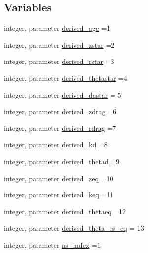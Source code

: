 \subsection*{Variables}
\begin{DoxyCompactItemize}
\item 
integer, parameter \mbox{\hyperlink{namespacecosmologytypes_ac41d8787a0c66b372de6431ec8d5d90e}{derived\+\_\+age}} =1
\item 
integer, parameter \mbox{\hyperlink{namespacecosmologytypes_ae9b4848c3438334ab15af3a9c5e38947}{derived\+\_\+zstar}} =2
\item 
integer, parameter \mbox{\hyperlink{namespacecosmologytypes_a273d7a236ebfc592e91d30f5f1d65691}{derived\+\_\+rstar}} =3
\item 
integer, parameter \mbox{\hyperlink{namespacecosmologytypes_a3828603ab7ab791295ab034337359f18}{derived\+\_\+thetastar}} =4
\item 
integer, parameter \mbox{\hyperlink{namespacecosmologytypes_ad7c434d95788f75aebc8ad1a2344ae22}{derived\+\_\+dastar}} = 5
\item 
integer, parameter \mbox{\hyperlink{namespacecosmologytypes_a2560d826bb11395cab2b36e611467be4}{derived\+\_\+zdrag}} =6
\item 
integer, parameter \mbox{\hyperlink{namespacecosmologytypes_abccb586a131096107b8e9d3b4e9ef8e3}{derived\+\_\+rdrag}} =7
\item 
integer, parameter \mbox{\hyperlink{namespacecosmologytypes_aced8968e4a5258b1eb562971c4d49d5c}{derived\+\_\+kd}} =8
\item 
integer, parameter \mbox{\hyperlink{namespacecosmologytypes_a5a52bc52cd7bc22fa7f0f61ce2f7a67c}{derived\+\_\+thetad}} =9
\item 
integer, parameter \mbox{\hyperlink{namespacecosmologytypes_ad60924495182c1a45a6d505bb18ad377}{derived\+\_\+zeq}} =10
\item 
integer, parameter \mbox{\hyperlink{namespacecosmologytypes_a4001ca23b9dc519f82acc58ca8c530b2}{derived\+\_\+keq}} =11
\item 
integer, parameter \mbox{\hyperlink{namespacecosmologytypes_a80034ea7e9b15ff769de8da4c5320653}{derived\+\_\+thetaeq}} =12
\item 
integer, parameter \mbox{\hyperlink{namespacecosmologytypes_a2475050c0f8bf96fdeea239d996693ba}{derived\+\_\+theta\+\_\+rs\+\_\+eq}} = 13
\item 
integer, parameter \mbox{\hyperlink{namespacecosmologytypes_a46466f5670050f4167e8e9fbe5416298}{as\+\_\+index}} =1
\item 

\end{DoxyCompactItemize}
